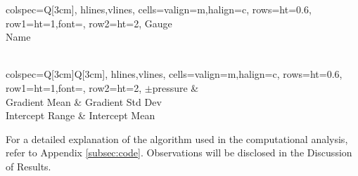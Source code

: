 \documentclass{article}
\begin{document}
\begin{minipage}{0.45\textwidth}
		\begin{minipage}[t]{0.4\textwidth}
			\centering
			\begin{tblr}{
					colspec={Q[3cm]},
					hlines,vlines,
					cells={valign=m,halign=c},
					rows={ht=0.6\baselineskip},
					row{1}={ht=1\baselineskip,font=\bfseries},
					row{2}={ht=2\baselineskip},
				}
				Gauge \\
				 Name \\
				\\[6pt]
			\end{tblr}
		\end{minipage}\hspace{0.7em}
		\begin{minipage}[t]{0.4\textwidth}
			\centering
			\begin{tblr}{
					colspec={Q[3cm]Q[3cm]},
					hlines,vlines,
					cells={valign=m,halign=c},
					rows={ht=0.6\baselineskip},
					row{1}={ht=1\baselineskip,font=\bfseries},
					row{2}={ht=2\baselineskip},
				}
				 $\pm$pressure & \\
				Gradient Mean & Gradient Std Dev \\
				Intercept Range & Intercept Mean \\
			\end{tblr}
		\end{minipage}
\end{minipage}\hspace{7em}
\begin{minipage}{0.4\textwidth}
	For a detailed explanation of the algorithm used in the computational analysis, refer to Appendix \ref{subsec:code}. Observations will be disclosed in the Discussion of Results.
\end{minipage}\\[8pt]
\end{document}
